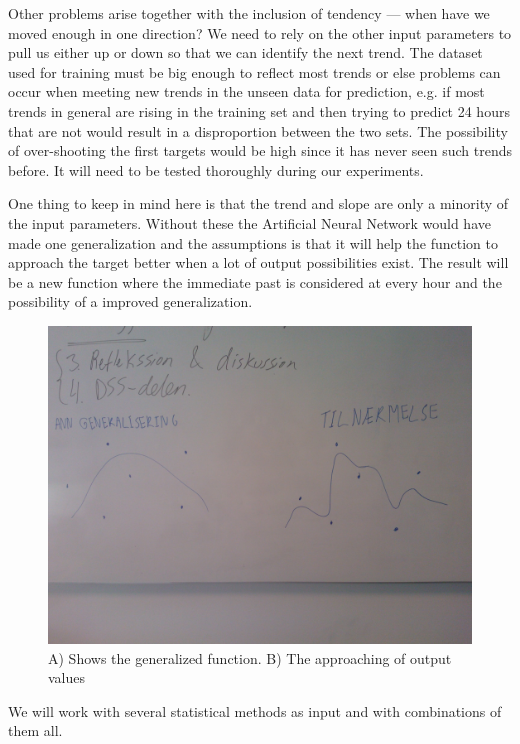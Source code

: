 Other problems arise together with the inclusion of tendency --- when have we moved enough in one direction? We need to rely on the other input parameters to pull us either up or down so that we can identify the next trend. The dataset used for training must be big enough to reflect most trends or else problems can occur when meeting new trends in the unseen data for prediction, e.g. if most trends in general are rising in the training set and then trying to predict 24 hours that are not would result in a disproportion between the two sets. The possibility of over-shooting the first targets would be high since it has never seen such trends before.    It will need to be tested thoroughly during our experiments. 

One thing to keep in mind here is that the trend and slope are only a minority of the input parameters. Without these the Artificial Neural Network would have made one generalization and the assumptions is that it will help the function to approach the target better when a lot of output possibilities exist. The result will be a new function where the immediate past is considered at every hour and the possibility of a improved generalization.

\begin{figure}[H]
\centering
\includegraphics[width=0.99\linewidth,natwidth=898,natheight=587]{billeder/WP_000057.jpg}
\caption{A) Shows the generalized function. B) The approaching of output values}
\label{fig:WP}
\end{figure}

We will work with several statistical methods as input and with combinations of them all. 

